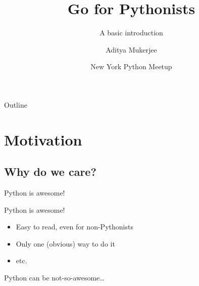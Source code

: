\documentclass{beamer}
\title[Go for Pythonists] %
{Go for Pythonists}
\subtitle
{A basic introduction} %
\author[Aditya Mukerjee] %
{Aditya Mukerjee}
\date[March 7, 2013] %
{New York Python Meetup}
\begin{document}
\begin{frame}
  \titlepage
\end{frame}

\begin{frame}{Outline}
    \tableofcontents[pausesections]
\end{frame}




\section{Motivation}

\subsection[Why?]{Why do we care?}

\begin{frame}{}
    \begin{center}
        Python is awesome!
    \end{center}
\end{frame}


\begin{frame}{Python is awesome!}

  \begin{itemize}
  \item
      Easy to read, even for non-Pythonists
  \item
      Only one (obvious) way to do it
  \item
      etc.
  \end{itemize}
\end{frame}

\begin{frame}{}
    \begin{center}
        Python can be not-so-awesome\dots
    \end{center}
\end{frame}
\end{document}

